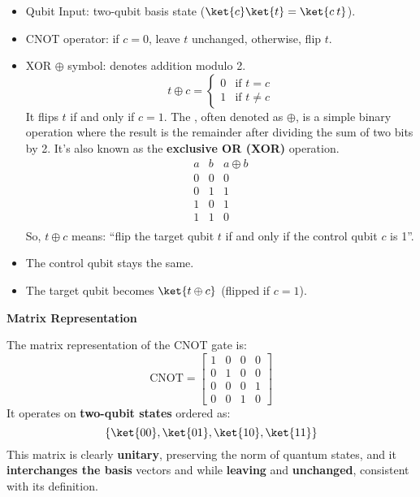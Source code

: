 \begin{itemize}
    \item Qubit Input: two-qubit basis state  ($\ket{c}\ket{t} = \ket{c \: t}$).
    \item CNOT operator: if $c=0$, leave $t$ unchanged, otherwise, flip $t$.
    \item XOR $\oplus$ symbol: denotes addition modulo 2.
    \begin{equation*}
        t \oplus c =
        \begin{cases}
            0 & \text{if } t = c \\
            1 & \text{if } t \neq c
        \end{cases}
    \end{equation*}
    It flips $t$ if and only if $c = 1$. The , often denoted as $ \oplus $, is a simple binary operation where the result is the remainder after dividing the sum of two bits by 2. It's also known as the \textbf{exclusive OR (XOR)} operation.
    \begin{equation*}
        \begin{array}{c|c||c}
            a & b & a \oplus b \\
            \hline
            0 & 0 & 0 \\
            0 & 1 & 1 \\
            1 & 0 & 1 \\
            1 & 1 & 0 \\
        \end{array}
    \end{equation*}
    So, $t \oplus c$ means: ``flip the target qubit $t$ if and only if the control qubit $c$ is 1''.
    \item The control qubit  stays the same.
    \item The target qubit  becomes $\ket{t \oplus c}$ (flipped if $c = 1$).
\end{itemize}

\highspace
\begin{flushleft}
    \textcolor{Green3}{ \textbf{Matrix Representation}}
\end{flushleft}
The matrix representation of the CNOT gate is:
\begin{equation}
    \text{CNOT} =
    \begin{bmatrix}
        1 & 0 & 0 & 0 \\
        0 & 1 & 0 & 0 \\
        0 & 0 & 0 & 1 \\
        0 & 0 & 1 & 0
    \end{bmatrix}
\end{equation}
It operates on \textbf{two-qubit states} ordered as:
\begin{equation*}
    \left\{\ket{00}, \ket{01}, \ket{10}, \ket{11}\right\}
\end{equation*}
This matrix is clearly \textbf{unitary}, preserving the norm of quantum states, and it \textbf{interchanges the basis} vectors  and  while \textbf{leaving}  and  \textbf{unchanged}, consistent with its definition.

